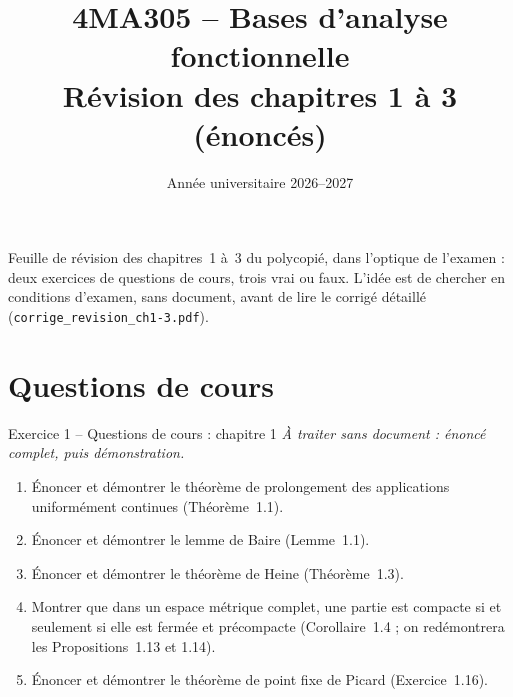 \documentclass[11pt,a4paper]{article}
\title{\textbf{4MA305 -- Bases d'analyse fonctionnelle}\\[2mm]
\Large Révision des chapitres 1 à 3 (énoncés)}
\author{}
\date{Année universitaire 2026--2027}
\theoremstyle{definition}
\begin{document}
\maketitle

\begin{commentaire}
Feuille de révision des chapitres~1 à~3 du polycopié, dans l'optique de l'examen : deux exercices de questions de cours, trois vrai ou faux. L'idée est de chercher en conditions d'examen, sans document, avant de lire le corrigé détaillé (\texttt{corrige\_revision\_ch1-3.pdf}).
\end{commentaire}

\section*{Questions de cours}

\begin{exo}{Exercice 1 -- Questions de cours : chapitre 1}
\emph{À traiter sans document : énoncé complet, puis démonstration.}
\begin{enumerate}[label=(\alph*)]
  \item Énoncer et démontrer le théorème de prolongement des applications uniformément continues (Théorème~1.1).
  \item Énoncer et démontrer le lemme de Baire (Lemme~1.1).
  \item Énoncer et démontrer le théorème de Heine (Théorème~1.3).
  \item Montrer que dans un espace métrique complet, une partie est compacte si et seulement si elle est fermée et précompacte (Corollaire~1.4 ; on redémontrera les Propositions~1.13 et 1.14).
  \item Énoncer et démontrer le théorème de point fixe de Picard (Exercice~1.16).
\end{enumerate}
\end{exo}
\end{document}
